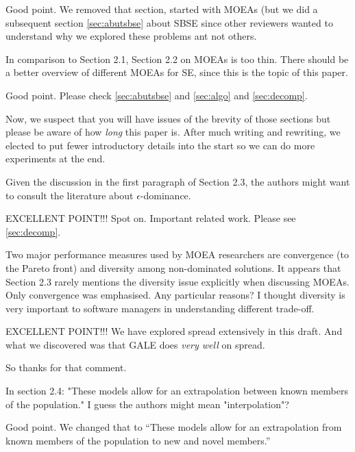 \documentclass[10pt,journal,compsoc]{IEEEtran}
\newcommand{\tion}[1]{\textsection\ref{sec:#1}}
\newenvironment{changed}{\par}{\par}
\newcommand{\ADD}[1]{#1}
\begin{document}
\begin{changed}
Good point. We removed that section, started with MOEAs (but we
did a subsequent section \tion{abutsbse} about SBSE since other reviewers
wanted to understand why we explored these problems ant not others.
\end{changed}

In comparison to Section 2.1, Section 2.2 on MOEAs is too thin. There
should be a better overview of different MOEAs for SE, since this is the
topic of this paper.


\begin{changed}
Good point. Please check \tion{abutsbse}
and \tion{algo} and \tion{decomp}.

Now, we suspect that you will have issues of the brevity of those sections
but please be aware of how {\em long} this paper is. After much writing
and rewriting, we elected to put fewer introductory details into the start
so we can do more experiments at the end. 
\end{changed}

Given the discussion in the first paragraph of Section 2.3, the authors
might want to consult the literature about $\epsilon$-dominance.


\begin{changed}
EXCELLENT POINT!!!  Spot on. Important related work. Please see  \tion{decomp}.

\end{changed}

Two major performance measures used by MOEA researchers are convergence
(to the Pareto front) and diversity among non-dominated solutions. It
appears that Section 2.3 rarely mentions the diversity issue explicitly
when discussing MOEAs. Only convergence was emphasised. Any particular
reasons? I thought diversity is very important to software managers in
understanding different trade-off.


\begin{changed}
EXCELLENT POINT!!!  We have explored spread extensively in this draft.
And what we discovered was that GALE does {\em very well} on spread.

So thanks for that comment.
\end{changed}


In section 2.4: "These models allow for an extrapolation between known
members of the population." I guess the authors might mean
"interpolation"?
\begin{changed}
Good point. We changed that to  ``These models allow
for an extrapolation from \ADD{known members of the
population to new and novel members}.''
\end{changed}
\end{document}

